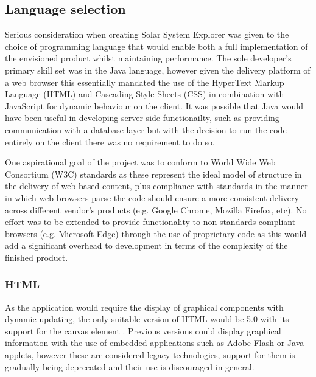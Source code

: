 \documentclass[twoside]{bhamthesis}
\begin{document}
\subsection{Language selection}

Serious consideration when creating Solar System Explorer was given to the choice of programming language that would enable both a full implementation of the envisioned product whilst maintaining performance. The sole developer's primary skill set was in the Java language, however given the delivery platform of a web browser this essentially mandated the use of the HyperText Markup Language (HTML) and Cascading Style Sheets (CSS) in combination with JavaScript for dynamic behaviour on the client. It was possible that Java would have been useful in developing server-side functionailty, such as providing communication with a database layer but with the decision to run the code entirely on the client there was no requirement to do so.

One aspirational goal of the project was to conform to World Wide Web Consortium (W3C) standards as these represent the ideal model of structure in the delivery of web based content, plus compliance with standards in the manner in which web browsers parse the code should ensure a more consistent delivery across different vendor's products (e.g. Google Chrome, Mozilla Firefox, etc). No effort was to be extended to provide functionality to non-standards compliant browsers (e.g. Microsoft Edge) through the use of proprietary code as this would add a significant overhead to development in terms of the complexity of the finished product.


\subsubsection{HTML}
As the application would require the display of graphical components with dynamic updating, the only suitable version of HTML would be 5.0 with its support for the canvas element \cite{the_world_wide_web_consortium_w3c_html5_2014}. Previous versions could display graphical information with the use of embedded applications such as Adobe Flash or Java applets, however these are considered legacy technologies, support for them is gradually being deprecated \cite{adobe_corporate_communications_flash_2017} and their use is discouraged in general.
\end{document}
